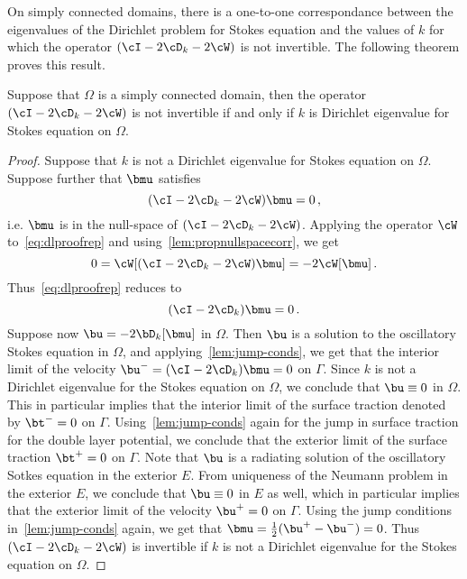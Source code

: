 On simply connected domains, there is a one-to-one correspondance between
the eigenvalues of the Dirichlet problem for Stokes equation
and the values of $k$ for which the operator $(\cI - 2\cD_{k} - 2\cW)$
is not invertible. 
The following theorem proves this result.

\begin{thrm}
\label{thm:dlmain}
Suppose that $\Omega$ is a simply connected domain, then the operator
$(\cI - 2\cD_{k} - 2 \cW)$ is not invertible if and only if $k$ is 
Dirichlet eigenvalue for Stokes equation on $\Omega$.
\end{thrm}
\begin{proof}
Suppose that $k$ is not a Dirichlet eigenvalue for Stokes equation on
$\Omega$. 
Suppose further that $\bmu$ satisfies
\begin{equation}
(\cI - 2\cD_{k} - 2\cW) \bmu = 0 \, , \label{eq:dlproofrep}
\end{equation}
i.e. $\bmu$ is in the null-space
of $(\cI - 2 \cD_{k} - 2 \cW)$. 
Applying the operator $\cW$ to~\cref{eq:dlproofrep} and 
using~\cref{lem:propnullspacecorr}, we get
\begin{equation}
0 = \cW [(\cI - 2\cD_{k} - 2\cW)\bmu] = -2\cW [\bmu] \, .
\end{equation}
Thus~\cref{eq:dlproofrep} reduces to
\begin{equation}
(\cI - 2 \cD_{k})\bmu = 0\, .
\end{equation}
Suppose now $\bu = -2\bD_{k}[\bmu]$ in $\Omega$.
Then $\bu$ is a solution to the oscillatory Stokes equation in $\Omega$,
and applying~\cref{lem:jump-conds}, we get that the interior
limit of the velocity $\bu^{-} = (\cI - 2\cD_{k}) \bmu = 0$ on $\Gamma$. 
Since $k$ is not a Dirichlet eigenvalue for the Stokes equation on 
$\Omega$, we conclude that $\bu \equiv 0$ in $\Omega$. 
This in particular implies that the interior limit of the surface traction
denoted by $\bt^{-} = 0$ on $\Gamma$. 
Using~\cref{lem:jump-conds} again for the jump in surface traction
for the double layer potential, we conclude that the exterior limit
of the surface traction $\bt^{+} = 0$ on $\Gamma$. 
Note that $\bu$ is a radiating solution of the oscillatory
Sotkes equation in the exterior $E$.
From uniqueness of the Neumann problem in the exterior $E$, we conclude
that $\bu \equiv 0$ in $E$ as well, which in particular implies that
the exterior limit of the velocity $\bu^{+}=0$ on $\Gamma$.   
Using the jump conditions in~\cref{lem:jump-conds} again, we
get that $\bmu = \frac{1}{2}(\bu^{+} - \bu^{-}) = 0$.
Thus $(\cI - 2\cD_{k} - 2\cW)$ is invertible if $k$ is not a Dirichlet
eigenvalue for the Stokes equation on $\Omega$.


\end{proof}
